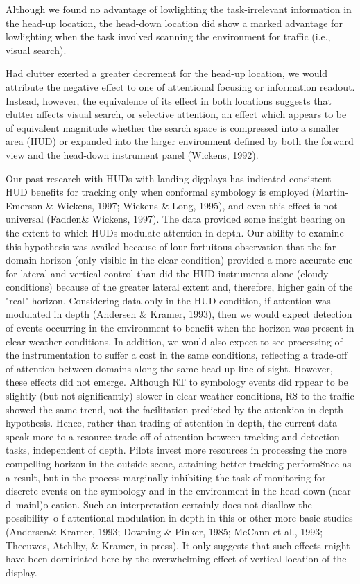 \documentclass[utf8,bachelor,manualbib]{gradu3}
\begin{document}
Although we found no advantage of lowlighting the task-irrelevant
information in the head-up location, the head-down location did show a marked
advantage for lowlighting when the task involved scanning the environment for
traffic (i.e., visual search).

Had clutter exerted a greater decrement for the head-up location, we would attribute the negative effect to one of attentional focusing or information readout. Instead, however, the equivalence of its effect in both locations suggests that clutter affects visual search, or selective attention, an effect which appears to be of equivalent magnitude whether the search space is compressed into a smaller area (HUD) or expanded into the larger environment defined by both the forward view and the head-down instrument panel (Wickens, 1992).


Our past research with
HUDs with landing digplays has indicated consistent HUD benefits for tracking
only when conformal symbology is employed (Martin-Emerson \& Wickens, 1997;
Wickens \& Long, 1995), and even this effect is not universal (Fadden\& Wickens,
1997).
The data provided some insight bearing on the extent to which HUDs modulate
attention in depth. Our ability to examine this hypothesis was availed because of
lour fortuitous observation that the far-domain horizon (only visible in the clear
condition) provided a more accurate cue for lateral and vertical control than did the HUD instruments alone (cloudy conditions) because of the greater lateral extent and, therefore, higher gain of the "real" horizon. Considering data only in the HUD condition, if attention was modulated in depth (Andersen \& Kramer, 1993), then we would expect detection of events occurring in the environment to benefit when the horizon was present in clear weather conditions. In addition, we would also expect to see processing of the instrumentation to suffer a cost in the same conditions, reflecting a trade-off of attention between domains along the same head-up line of sight. However, these effects did not emerge. Although RT to symbology events did rppear to be slightly (but not significantly) slower in clear weather conditions, R\$ to the traffic showed the same trend, not the facilitation predicted by the attenkion-in-depth hypothesis. Hence, rather than trading of attention in depth, the current data speak more to a resource trade-off of attention between tracking and detection tasks, independent of depth. Pilots invest more resources in processing the more compelling horizon in the outside scene, attaining better tracking perform\$nce as a result, but in the process marginally inhibiting the task of monitoring for discrete events on the symbology and in the environment in the head-down (near d~mainl)o cation. Such an interpretation certainly does not disallow the possibility~o f attentional modulation in depth in this or other more basic studies (Andersen\& Kramer, 1993; Downing \& Pinker, 1985; McCann et al., 1993; Theeuwes, Atchlby, \& Kramer, in press). It only suggests that such effects rnight have been dorniriated here by the overwhelming effect of vertical location of the display.
\end{document}
